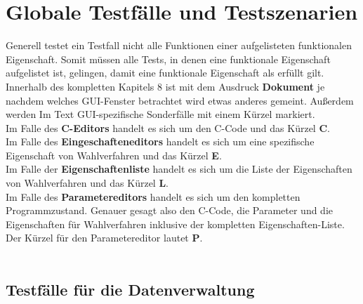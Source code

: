 \documentclass[a4paper]{scrreprt}
\begin{document}
\chapter{Globale Testfälle und Testszenarien}

Generell testet ein Testfall nicht alle Funktionen einer aufgelisteten funktionalen Eigenschaft. Somit müssen alle Tests, in denen eine funktionale Eigenschaft aufgelistet ist, gelingen, damit eine funktionale Eigenschaft als erfüllt gilt. \\
Innerhalb des kompletten Kapitels 8 ist mit dem Ausdruck \textbf{Dokument} je nachdem welches GUI-Fenster betrachtet wird etwas anderes gemeint. Außerdem werden Im Text GUI-spezifische Sonderfälle mit einem Kürzel markiert. \\
Im Falle des \textbf{C-Editors} handelt es sich um den C-Code und das Kürzel \textbf{C}. \\
Im Falle des \textbf{Eingeschafteneditors} handelt es sich um eine spezifische Eigenschaft von Wahlverfahren und das Kürzel \textbf{E}. \\
Im Falle der \textbf{Eigenschaftenliste} handelt es sich um die Liste der Eigenschaften von Wahlverfahren und das Kürzel \textbf{L}. \\
Im Falle des \textbf{Parametereditors} handelt es sich um den kompletten Programmzustand. Genauer gesagt also den C-Code, die Parameter und die Eigenschaften für Wahlverfahren inklusive der kompletten Eigenschaften-Liste. Der Kürzel für den Parametereditor lautet \textbf{P}. \\ \\

\section{Testfälle für die Datenverwaltung}
\end{document}
